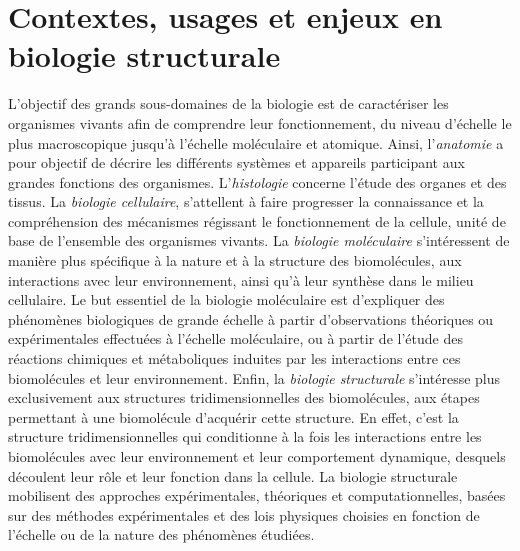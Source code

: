 \chapter[Contextes, usages et enjeux en biologie structurale]{Contextes, usages et enjeux en biologie structurale}
\minitoc
\cleardoublepage






L'objectif des grands sous-domaines de la biologie est de caractériser les organismes vivants afin de comprendre leur fonctionnement, du niveau d'échelle le plus macroscopique jusqu'à l'échelle moléculaire et atomique. Ainsi, l'\emph{anatomie} a pour objectif de décrire les différents systèmes et appareils participant aux grandes fonctions des organismes. L'\emph{histologie} concerne l'étude des organes et des tissus. La \emph{biologie  cellulaire}, s'attellent à faire progresser la connaissance et la compréhension des mécanismes régissant le fonctionnement de la cellule, unité de base de l’ensemble des organismes vivants. La \emph{biologie moléculaire} s'intéressent de manière plus spécifique à la nature et à la structure des biomolécules, aux interactions avec leur environnement, ainsi qu'à leur synthèse dans le milieu cellulaire. Le but essentiel de la biologie moléculaire est d'expliquer des phénomènes biologiques de grande échelle à partir d'observations théoriques ou expérimentales effectuées à l'échelle moléculaire, ou à partir de l'étude des réactions chimiques et métaboliques induites par les interactions entre ces biomolécules et leur environnement. Enfin, la \emph{biologie structurale} s'intéresse plus exclusivement aux structures tridimensionnelles des biomolécules, aux  étapes permettant à une biomolécule d'acquérir cette structure. En effet, c'est la structure tridimensionnelles qui conditionne à la fois les interactions entre les biomolécules avec leur environnement et leur comportement dynamique, desquels découlent leur rôle et leur fonction dans la cellule. La biologie structurale mobilisent des approches expérimentales, théoriques et computationnelles, basées sur des méthodes expérimentales et des lois physiques choisies en fonction de l'échelle ou de la nature des phénomènes étudiées.

